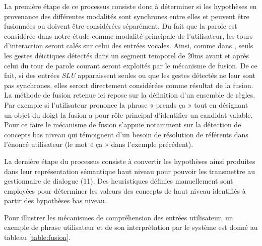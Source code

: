 \documentclass[a4paper,11pt,twoside]{StyleThese}
\begin{document}
\begin{itemize}
La première étape de ce processus consiste donc à déterminer si les hypothèses en
provenance des différentes modalités sont synchrones entre elles et peuvent être fusionnées ou doivent être considérées séparément. Du fait que la parole est considérée dans notre étude comme modalité principale de l’utilisateur, les tours d’interaction seront calés sur celui des entrées vocales. Ainsi, comme dans \cite{Holzapfel2004}, seuls les gestes déictiques détectés dans un segment temporel de 20ms avant et après celui du tour de parole courant seront exploités par le mécanisme de fusion. De ce fait, si des entrées \textit{SLU} apparaissent seules ou que les gestes détectés ne leur sont pas synchrones, elles seront directement considérées comme résultat de la fusion. La méthode de fusion retenue ici repose sur la définition d’un ensemble
de règles.
Par exemple si l’utilisateur prononce la
phrase « prends ça » tout en désignant un objet du doigt la fusion a pour rôle principal d’identifier un candidat valable. Pour ce faire le mécanisme de fusion s’appuie notamment sur la détection de concepts bas niveau qui témoignent d’un besoin de résolution de référents dans l’énoncé utilisateur (le mot « ça » dans l’exemple précédent).

La dernière étape du processus consiste à convertir les hypothèses ainsi produites
dans leur représentation sémantique haut niveau pour pouvoir les transmettre au gestionnaire de dialogue (11).
Des heuristiques définies manuellement sont employées pour déterminer les valeurs
des concepts de haut niveau identifiés à partir des hypothèses bas niveau.
\end{itemize}

Pour illustrer les mécanismes de compréhension des entrées utilisateur, un exemple de phrase utilisateur et de son interprétation par le système est donné au tableau \ref{table:fusion}.

\end{document}
